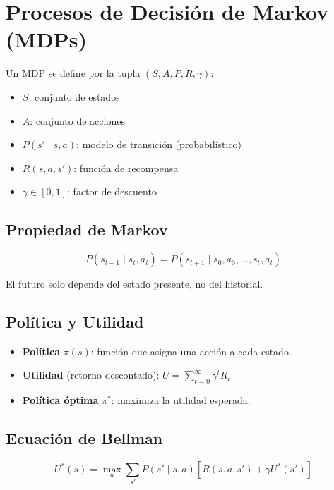 \section{Procesos de Decisión de Markov (MDPs)}

\begin{definition}[MDP]
Un MDP se define por la tupla $(S, A, P, R, \gamma)$:
\begin{itemize}
    \item $S$: conjunto de estados
    \item $A$: conjunto de acciones
    \item $P(s' \mid s, a)$: modelo de transición (probabilístico)
    \item $R(s, a, s')$: función de recompensa
    \item $\gamma \in [0, 1]$: factor de descuento
\end{itemize}
\end{definition}

\subsection{Propiedad de Markov}

$$P(s_{t+1} \mid s_t, a_t) = P(s_{t+1} \mid s_0, a_0, \ldots, s_t, a_t)$$

El futuro solo depende del estado presente, no del historial.

\subsection{Política y Utilidad}

\begin{itemize}
    \item \textbf{Política} $\pi(s)$: función que asigna una acción a cada estado.
    \item \textbf{Utilidad} (retorno descontado): $U = \sum_{t=0}^{\infty} \gamma^t R_t$
    \item \textbf{Política óptima} $\pi^*$: maximiza la utilidad esperada.
\end{itemize}

\subsection{Ecuación de Bellman}

$$U^*(s) = \max_a \sum_{s'} P(s' \mid s, a) \left[ R(s, a, s') + \gamma U^*(s') \right]$$

